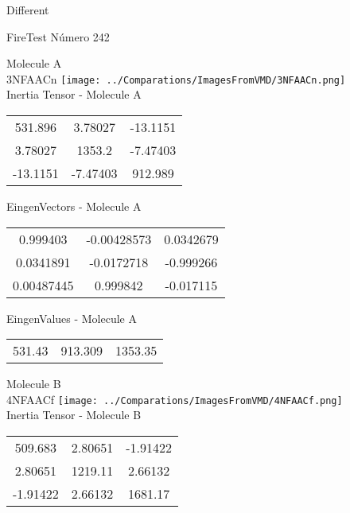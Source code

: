 \begin{center}
\vtab
\vtab
\textcolor{NavyBlue}{\Large Different}
\end{center}

 \newpage

\vtab[-2cm]
\begin{center}
{\large FireTest \tab Número 242}
\end{center}
\begin{multicols}{2}
\begin{center}

Molecule A \\ 
3NFAACn
\texttt{[image: ../Comparations/ImagesFromVMD/3NFAACn.png]}
\\
Inertia Tensor - Molecule A \\
\vtab

\begin{tabular}{|c c c|}
531.896	 & 	3.78027	 & 	-13.1151	 \\
3.78027	 & 	1353.2	 & 	-7.47403	 \\
-13.1151	 & 	-7.47403	 & 	912.989
\end{tabular}

\vtab
 EingenVectors - Molecule A     \\
\vtab
\begin{tabular}{|c c c|}
0.999403	 & 	-0.00428573	 & 	0.0342679	 \\
0.0341891	 & 	-0.0172718	 & 	-0.999266	 \\
0.00487445	 & 	0.999842	 & 	-0.017115
\end{tabular}

\vtab
 EingenValues - Molecule A     \\
\vtab
\begin{tabular}{|c c c|}
531.43	 & 	913.309	 & 	1353.35	 \\
\end{tabular}
\columnbreak

Molecule B \\ 
4NFAACf
\texttt{[image: ../Comparations/ImagesFromVMD/4NFAACf.png]}
\\
Inertia Tensor - Molecule B \\
\vtab

\begin{tabular}{|c c c|}
509.683	 & 	2.80651	 & 	-1.91422	 \\
2.80651	 & 	1219.11	 & 	2.66132	 \\
-1.91422	 & 	2.66132	 & 	1681.17
\end{tabular}


\end{center}
\end{multicols}
